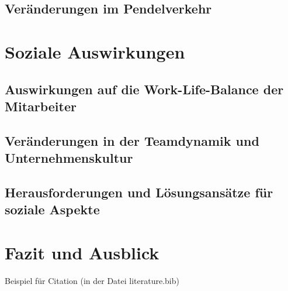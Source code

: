 \documentclass[runningheads]{llncs}
\begin{document}
\subsection{Veränderungen im Pendelverkehr}

\newpage
\section{Soziale Auswirkungen}

\subsection{Auswirkungen auf die Work-Life-Balance der Mitarbeiter}

\subsection{Veränderungen in der Teamdynamik und Unternehmenskultur}

\subsection{Herausforderungen und Lösungsansätze für soziale Aspekte}

\newpage
\section{Fazit und Ausblick}

Beispiel für Citation\cite{noauthor_internet-konferenz_2021}
(in der Datei literature.bib)


\newpage


\end{document}
